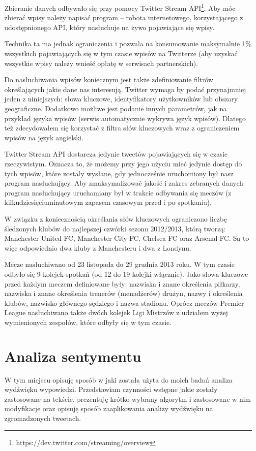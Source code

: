 Zbieranie danych odbywało się przy pomocy Twitter Stream 
API\footnote{https://dev.twitter.com/streaming/overview}.
Aby móc zbierać wpisy należy napisać program -- robota internetowego,
korzystającego z udostępnionego API, który nasłuchuje na żywo pojawiające się wpisy.

Technika ta ma jednak ograniczenia i pozwala na konsumowanie maksymalnie 1\%
wszystkich pojawiających się w tym czasie wpisów na Twitterze (aby uzyskać
wszystkie wpisy należy wnieść opłatę w serwisach partnerskich).

Do nasłuchiwania wpisów koniecznym jest także zdefiniowanie filtrów
określających jakie dane nas interesują. Twitter wymaga by podać przynajmniej
jeden z niniejszych: słowa kluczowe, identyfikatory użytkowników lub obszary
geograficzne. Dodatkowo możliwe jest podanie innych parametrów, jak na przykład
języka wpisów (serwis automatycznie wykrywa język wpisów). 
Dlatego też zdecydowałem się korzystać z filtra słów kluczowych
wraz z ograniczeniem wpisów na język angielski.

Twitter Stream API dostarcza jedynie tweetów pojawiających się w czasie
rzeczywistym. Oznacza to, że możemy przy jego użyciu mieć jedynie dostęp do tych
wpisów, które zostały wysłane, gdy jednocześnie uruchomiony był nasz program
nasłuchujący. Aby zmaksymalizować jakość i zakres zebranych danych program
nasłuchujący uruchamiany był w trakcie odbywania się meczów 
(z kilkudziesięciuminutowym zapasem czasowym przed i po spotkaniu).

W związku z koniecznością określania słów kluczowych ograniczono liczbę
śledzonych klubów do najlepszej czwórki sezonu 2012/2013, którą tworzą:
Manchester United FC, Manchester City FC, Chelsea FC oraz Arsenal FC.
Są to więc odpowiednio dwa kluby z Manchesteru i dwa z Londynu.

Mecze nasłuchiwano od 23 listopada do 29 grudnia 2013 roku. W tym czasie odbyło
się 9 kolejek spotkań (od 12 do 19 kolejki włącznie). Jako słowa kluczowe przed
każdym meczem definiowane były: nazwiska i znane określenia
piłkarzy, nazwiska i znane określenia trenerów (menadżerów) drużyn, nazwy i
określenia klubów, nazwisko głównego sędziego i nazwa stadionu. 
Oprócz meczów Premier League nasłuchiwano także dwóch kolejek Ligi Mistrzów
z udziałem wyżej wymienionych zespołów, które odbyły się w tym czasie.

\clearpage
\section{Analiza sentymentu}
\label{section:analizasentymentu}
W tym miejscu opisuję sposób w jaki została użyta do moich badań analiza
wydźwięku wypowiedzi. Przedstawiam czynności wstępne jakie zostały zastosowane
na tekście, prezentuję krótko wybrany algorytm i zastosowane w nim modyfikacje
oraz opisuję sposób zaaplikowania analizy wydźwięku na zgromadzonych tweetach.

